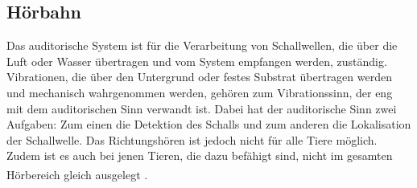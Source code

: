 \documentclass[12pt,a4paper,pdftex]{article}
\begin{document}
\subsection{Hörbahn}

Das auditorische System  ist für die Verarbeitung von Schallwellen, die über die Luft oder Wasser übertragen und vom System empfangen werden, zuständig. Vibrationen, die über den Untergrund oder festes Substrat übertragen werden und mechanisch wahrgenommen werden, gehören zum Vibrationssinn, der eng mit dem auditorischen Sinn verwandt ist.
Dabei hat der auditorische Sinn zwei Aufgaben: Zum einen die Detektion des Schalls und zum anderen die Lokalisation der Schallwelle. Das Richtungshören ist jedoch nicht für alle Tiere möglich. Zudem ist es auch bei jenen Tieren, die dazu befähigt sind, nicht im gesamten Hörbereich gleich ausgelegt \textsuperscript{\cite[18]{penzlin2005tierphys}}.
\end{document}
